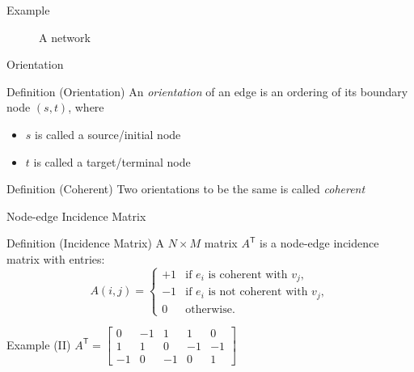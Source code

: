 \documentclass[
  ignorenonframetext,
]{beamer}
\providecommand{\tightlist}{%
  \setlength{\itemsep}{0pt}\setlength{\parskip}{0pt}}
\begin{document}
\begin{frame}{Example}
\protect\hypertarget{example}{}
\begin{figure}[hp]
\centering

\caption{A network}%
\label{fig:network}
\end{figure}
\end{frame}

\begin{frame}{Orientation}
\protect\hypertarget{orientation}{}
\begin{block}{Definition (Orientation)}
\protect\hypertarget{definition-orientation}{}
An \emph{orientation} of an edge is an ordering of its boundary node
\((s, t)\), where

\begin{itemize}
\tightlist
\item
  \(s\) is called a source/initial node
\item
  \(t\) is called a target/terminal node
\end{itemize}
\end{block}

\begin{block}{Definition (Coherent)}
\protect\hypertarget{definition-coherent}{}
Two orientations to be the same is called \emph{coherent}
\end{block}
\end{frame}

\begin{frame}{Node-edge Incidence Matrix}
\protect\hypertarget{node-edge-incidence-matrix}{}
\begin{block}{Definition (Incidence Matrix)}
\protect\hypertarget{definition-incidence-matrix}{}
A \(N \times M\) matrix \(A^\mathsf{T}\) is a node-edge incidence matrix
with entries: \[A(i,j) = \begin{cases}
  +1 & \text{if $e_i$ is coherent with $v_j$}, \\
  -1 & \text{if $e_i$ is not coherent with $v_j$}, \\
   0 & \text{otherwise.}
  \end{cases}\]
\end{block}

\begin{block}{Example (II)}
\protect\hypertarget{example-ii}{}
\(A^\mathsf{T} = \begin{bmatrix} 0 & -1 & 1 & 1 & 0 \\ 1 & 1 & 0 & -1 & -1 \\ -1 & 0 & -1 & 0 & 1 \end{bmatrix}\)
\end{block}
\end{frame}
\end{document}

